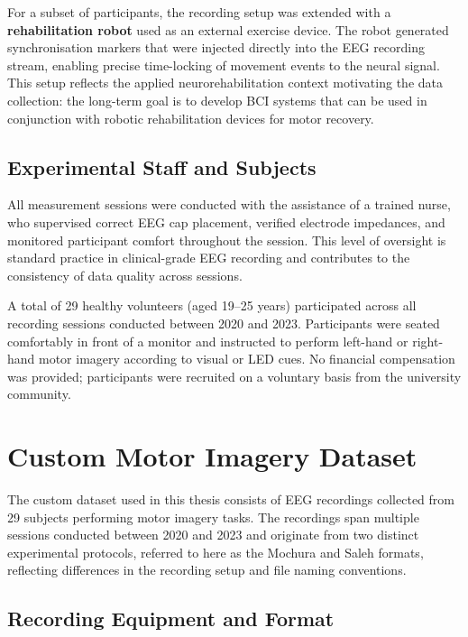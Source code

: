 \documentclass[english, bc, kiv, he, iso690alph, pdf]{fasthesis}
\begin{document}
For a subset of participants, the recording setup was extended with a \textbf{rehabilitation robot} used as an external exercise device. The robot generated synchronisation markers that were injected directly into the EEG recording stream, enabling precise time-locking of movement events to the neural signal. This setup reflects the applied neurorehabilitation context motivating the data collection: the long-term goal is to develop BCI systems that can be used in conjunction with robotic rehabilitation devices for motor recovery.

\subsection{Experimental Staff and Subjects}

All measurement sessions were conducted with the assistance of a trained nurse, who supervised correct EEG cap placement, verified electrode impedances, and monitored participant comfort throughout the session. This level of oversight is standard practice in clinical-grade EEG recording and contributes to the consistency of data quality across sessions.

A total of 29 healthy volunteers (aged 19--25 years) participated across all recording sessions conducted between 2020 and 2023. Participants were seated comfortably in front of a monitor and instructed to perform left-hand or right-hand motor imagery according to visual or LED cues. No financial compensation was provided; participants were recruited on a voluntary basis from the university community.

\section{Custom Motor Imagery Dataset}

The custom dataset used in this thesis consists of EEG recordings collected from 29 subjects performing motor imagery tasks. The recordings span multiple sessions conducted between 2020 and 2023 and originate from two distinct experimental protocols, referred to here as the Mochura and Saleh formats, reflecting differences in the recording setup and file naming conventions.

\subsection{Recording Equipment and Format}
\end{document}
